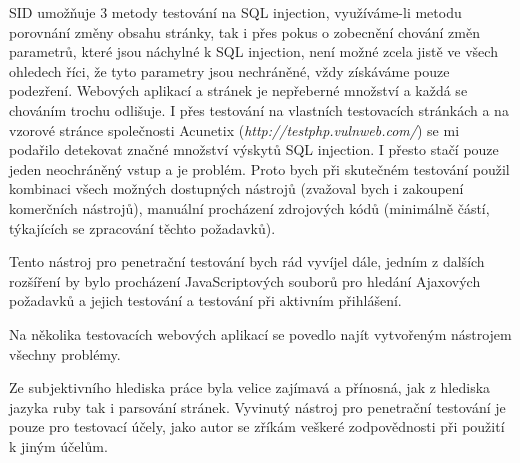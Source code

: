 \documentclass[12pt, a4paper]{report}
\begin{document}
SID umožňuje 3 metody testování na SQL injection, využíváme-li metodu porovnání změny obsahu stránky, tak i přes pokus o zobecnění chování změn parametrů, které jsou náchylné k SQL injection, není možné zcela jistě ve všech ohledech říci, že tyto parametry jsou nechráněné, vždy získáváme pouze podezření.  Webových aplikací a stránek je nepřeberné množství a každá se chováním trochu odlišuje. I přes testování na vlastních testovacích stránkách a na vzorové stránce společnosti Acunetix (\textit{http://testphp.vulnweb.com/}) se mi podařilo detekovat značné množství výskytů SQL injection. I přesto stačí pouze jeden neochráněný vstup a je problém. Proto bych při skutečném testování použil kombinaci všech možných dostupných nástrojů (zvažoval bych i zakoupení komerčních nástrojů), manuální procházení zdrojových kódů (minimálně částí, týkajících se zpracování těchto požadavků). 

Tento nástroj pro penetrační testování bych rád vyvíjel dále, jedním z dalších rozšíření by bylo procházení JavaScriptových souborů pro hledání Ajaxových požadavků a jejich testování a testování při aktivním přihlášení. 

Na několika testovacích webových aplikací se povedlo najít vytvořeným nástrojem všechny problémy.

Ze subjektivního hlediska práce byla velice zajímavá a přínosná, jak z hlediska jazyka ruby tak i parsování stránek. Vyvinutý nástroj pro penetrační testování je pouze pro testovací účely, jako autor se zříkám veškeré zodpovědnosti při použití k jiným účelům.
\end{document}
